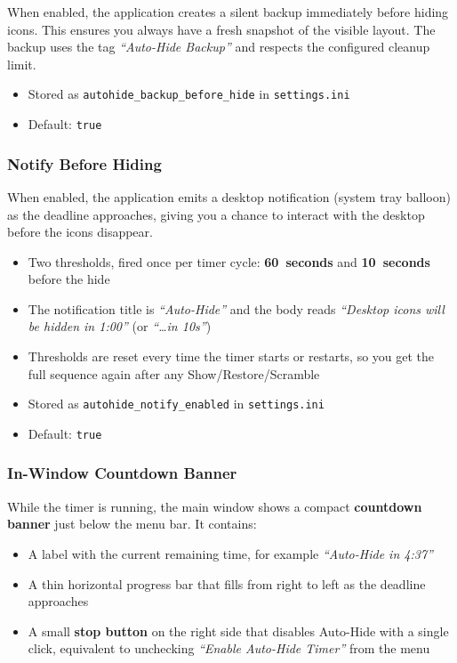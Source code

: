 \documentclass[a4paper,11pt]{article}
\begin{document}
When enabled, the application creates a silent backup immediately before
hiding icons. This ensures you always have a fresh snapshot of the
visible layout. The backup uses the tag \textit{``Auto-Hide Backup''}
and respects the configured cleanup limit.

\begin{itemize}
  \item Stored as \texttt{autohide\_backup\_before\_hide} in
    \texttt{settings.ini}
  \item Default: \texttt{true}
\end{itemize}

\subsubsection{Notify Before Hiding}

When enabled, the application emits a desktop notification
(system tray balloon) as the deadline approaches, giving you a chance
to interact with the desktop before the icons disappear.

\begin{itemize}
  \item Two thresholds, fired once per timer cycle:
    \textbf{60~seconds} and \textbf{10~seconds} before the hide
  \item The notification title is \textit{``Auto-Hide''} and the body
    reads \textit{``Desktop icons will be hidden in 1:00''} (or
    \textit{``\ldots in 10s''})
  \item Thresholds are reset every time the timer starts or restarts,
    so you get the full sequence again after any Show/Restore/Scramble
  \item Stored as \texttt{autohide\_notify\_enabled} in
    \texttt{settings.ini}
  \item Default: \texttt{true}
\end{itemize}

\subsubsection{In-Window Countdown Banner}

While the timer is running, the main window shows a compact
\textbf{countdown banner} just below the menu bar. It contains:

\begin{itemize}
  \item A label with the current remaining time, for example
    \textit{``Auto-Hide in 4:37''}
  \item A thin horizontal progress bar that fills from right to left
    as the deadline approaches
  \item A small \textbf{stop button} on the right side that disables
    Auto-Hide with a single click, equivalent to unchecking
    \textit{``Enable Auto-Hide Timer''} from the menu
\end{itemize}
\end{document}
